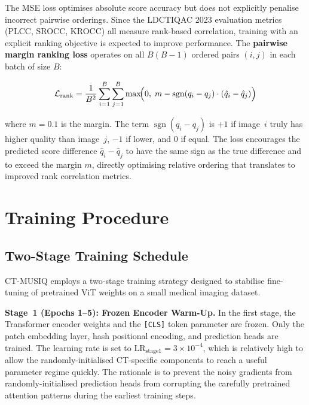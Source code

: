 The MSE loss optimises absolute score accuracy but does not explicitly penalise
incorrect pairwise orderings. Since the LDCTIQAC 2023 evaluation metrics (PLCC, SROCC,
KROCC) all measure rank-based correlation, training with an explicit ranking objective
is expected to improve performance. The \textbf{pairwise margin ranking loss} operates
on all $B(B-1)$ ordered pairs $(i, j)$ in each batch of size $B$:

\begin{equation}
    \mathcal{L}_{\text{rank}} = \frac{1}{B^2} \sum_{i=1}^{B} \sum_{j=1}^{B}
    \max\!\Bigl(0,\; m - \operatorname{sgn}(q_i - q_j) \cdot (\hat{q}_i - \hat{q}_j)\Bigr)
\end{equation}

where $m = 0.1$ is the margin. The term $\operatorname{sgn}(q_i - q_j)$ is $+1$ if
image~$i$ truly has higher quality than image~$j$, $-1$ if lower, and 0 if equal. The
loss encourages the predicted score difference $\hat{q}_i - \hat{q}_j$ to have the same
sign as the true difference and to exceed the margin $m$, directly optimising relative
ordering that translates to improved rank correlation metrics.


\section{Training Procedure}
\label{sec:training}

\subsection{Two-Stage Training Schedule}

CT-MUSIQ employs a two-stage training strategy designed to stabilise fine-tuning of
pretrained ViT weights on a small medical imaging dataset.

\textbf{Stage~1 (Epochs 1--5): Frozen Encoder Warm-Up.}
In the first stage, the Transformer encoder weights and the \texttt{[CLS]} token
parameter are frozen. Only the patch embedding layer, hash positional encoding, and
prediction heads are trained. The learning rate is set to
$\text{LR}_{\text{stage1}} = 3 \times 10^{-4}$, which is relatively high to allow the
randomly-initialised CT-specific components to reach a useful parameter regime quickly.
The rationale is to prevent the noisy gradients from randomly-initialised prediction
heads from corrupting the carefully pretrained attention patterns during the earliest
training steps.

